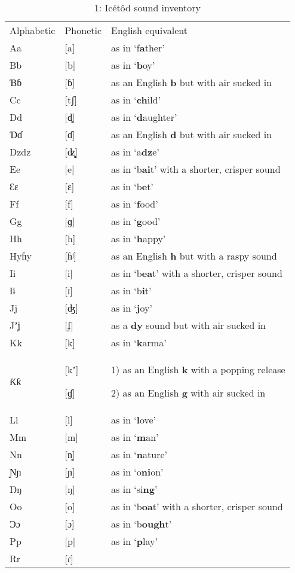 \begin{table}
\caption{1: Icétôd sound inventory}
\label{tab:2}

\begin{tabularx}{\textwidth}{XXX}
\lsptoprule

Alphabetic & Phonetic & English equivalent\\
Aa & [a] & as in ‘f\textbf{a}ther’\\
Bb & [b] & as in ‘\textbf{b}oy’\\
Ɓɓ & [ɓ] & as an English \textbf{b} but with air sucked in\\
Cc & [tʃ] & as in ‘\textbf{ch}ild’\\
Dd & [d̻] & as in ‘\textbf{d}aughter’\\
Ɗɗ & [ɗ] & as an English \textbf{d} but with air sucked in\\
Dzdz & [ʣ̻] & as in ‘a\textbf{dz}e’\\
Ee & [e] & as in ‘b\textbf{ai}t’ with a shorter, crisper sound\\
Ɛɛ & [ɛ] & as in ‘b\textbf{e}t’\\
Ff & [f] & as in ‘\textbf{f}ood’\\
Gg & [ɡ] & as in ‘\textbf{g}ood’\\
Hh & [h] & as in ‘\textbf{h}appy’\\
Hyɦy & [ɦʲ] & as an English \textbf{h} but with a raspy sound\\
Ii & [i] & as in ‘b\textbf{ea}t’ with a shorter, crisper sound\\
Ɨɨ & [ɪ] & as in ‘b\textbf{i}t’\\
Jj & [ʤ] & as in ‘\textbf{j}oy’\\
Jʼʝ & [ʄ] & as a \textbf{dy} sound but with air sucked in\\
Kk & [k] & as in ‘\textbf{k}arma’\\
Ƙƙ & [kʼ]

[ɠ] & 1) as an English \textbf{k} with a popping release

2) as an English \textbf{g} with air sucked in\\
Ll & [l] & as in ‘\textbf{l}ove’\\
Mm & [m] & as in ‘\textbf{m}an’\\
Nn & [n̻] & as in ‘\textbf{n}ature’\\
Ɲɲ & [ɲ] & as in ‘o\textbf{ni}on’\\
Ŋŋ & [ŋ] & as in ‘si\textbf{ng}’\\
Oo & [o] & as in ‘b\textbf{oa}t’ with a shorter, crisper sound\\
Ɔɔ & [ɔ] & as in ‘b\textbf{ough}t’\\
Pp & [p] & as in ‘\textbf{p}lay’\\
Rr & [ɾ]


\end{tabularx}
\end{table}
